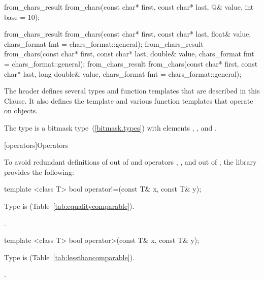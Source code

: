 \begin{codeblock}
{  from_chars_result from_chars(const char* first, const char* last,
                               @\seebelow@& value, int base = 10);

  from_chars_result from_chars(const char* first, const char* last, float& value,
                               chars_format fmt = chars_format::general);
  from_chars_result from_chars(const char* first, const char* last, double& value,
                               chars_format fmt = chars_format::general);
  from_chars_result from_chars(const char* first, const char* last, long double& value,
                               chars_format fmt = chars_format::general);
}
\end{codeblock}

\pnum
The header  defines several types and function templates
that are described in this Clause. It also defines the template 
and various function templates that operate on  objects.

\pnum
The type 
is a bitmask type~(\ref{bitmask.types})
with elements
,
,
and .

[operators]{Operators}

\pnum
To avoid redundant definitions of  out of 
and operators \tcode{>}, \tcode{<=}, and \tcode{>=} out of ,
the library provides the following:

%
\begin{itemdecl}
template <class T> bool operator!=(const T& x, const T& y);
\end{itemdecl}

\begin{itemdescr}
\pnum
\requires
Type  is  (Table~\ref{tab:equalitycomparable}).

\pnum
\returns
{}.
\end{itemdescr}

%
\begin{itemdecl}
template <class T> bool operator>(const T& x, const T& y);
\end{itemdecl}

\begin{itemdescr}
\pnum
\requires
Type  is  (Table~\ref{tab:lessthancomparable}).

\pnum
\returns
{}.
\end{itemdescr}

